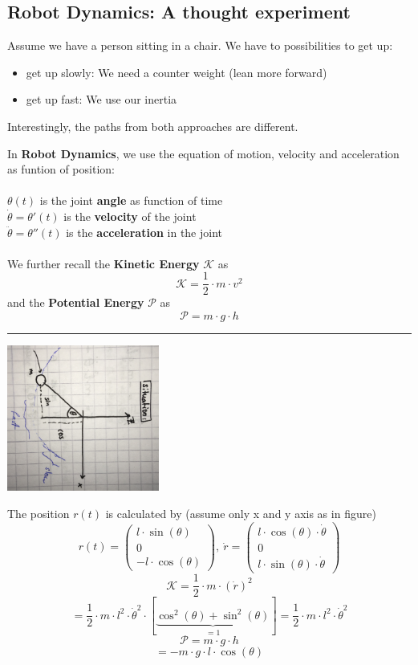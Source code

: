 \documentclass{exerciseBlue}
\begin{document}
\subsection{Robot Dynamics: A thought experiment}
Assume we have a person sitting in a chair. We have to possibilities to get up:
\begin{itemize}
	\item get up slowly: We need a counter weight (lean more forward)
	\item get up fast: We use our inertia
\end{itemize} 
Interestingly, the paths from both approaches are different.\\
\par In \textbf{Robot Dynamics}, we use the equation of motion, velocity and acceleration as funtion of position:\\\\
$\theta(t)$ is the joint \textbf{angle} as function of time\\
$\dot{\theta} = \theta'(t)$ is the \textbf{velocity} of the joint\\
$\ddot{\theta} = \theta''(t)$ is the \textbf{acceleration} in the joint\\\\
We further recall the \textbf{Kinetic Energy} $\mathcal{K}$ as
$$\mathcal{K} = \dfrac{1}{2}\cdot m \cdot v^2$$ and the \textbf{Potential Energy} $\mathcal{P}$ as
$$\mathcal{P} = m\cdot g \cdot h$$
\noindent\rule{\textwidth}{0.3pt}
\begin{center}
	\includegraphics[height = 4.8cm]{Images/Pendulum}
\end{center}
The position $r(t)$ is calculated by (assume only x and y axis as in figure)
$$r(t)=\begin{pmatrix}
l\cdot \sin (\theta)\\0\\-l\cdot \cos (\theta)
\end{pmatrix}, \ \dot{r}=\begin{pmatrix}
l\cdot \cos (\theta) \cdot \dot{\theta}\\0\\l\cdot \sin (\theta)\cdot \dot{\theta}
\end{pmatrix}$$
$$\mathcal{K} =  \dfrac{1}{2}\cdot m \cdot (\dot{r})^2$$
$$=\dfrac{1}{2}\cdot m\cdot l^2 \cdot \dot{\theta}^2 \cdot [\underbrace{\cos^2(\theta)+\sin^2(\theta)}_{=1}]=\dfrac{1}{2}\cdot m\cdot l^2 \cdot \dot{\theta}^2$$
$$\mathcal{P} = m\cdot g \cdot h$$
$$=-m\cdot g \cdot l\cdot\cos (\theta)$$
\end{document}
